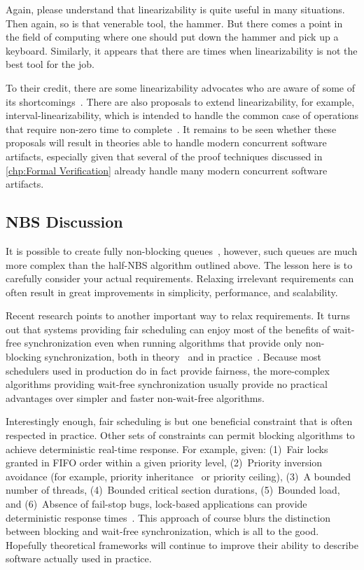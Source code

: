 Again, please understand that linearizability is quite useful in many
situations.
Then again, so is that venerable tool, the hammer.
But there comes a point in the field of computing where one should put
down the hammer and pick up a keyboard.
Similarly, it appears that there are times when linearizability is not
the best tool for the job.

To their credit, there are some linearizability advocates who are aware
of some of its shortcomings~\cite{SergioRajsbaum2020HistoryLinearizability}.
There are also proposals to extend linearizability, for example,
interval-linearizability, which is intended to handle the common case
of operations that require non-zero time to
complete~\cite{10.1145/3266457}.
It remains to be seen whether these proposals will result in theories
able to handle modern concurrent software artifacts, especially given
that several of the proof techniques discussed in \cref{chp:Formal
Verification} already handle many modern concurrent software artifacts.

\subsection{NBS Discussion}
\label{sec:advsync:NBS Discussion}

It is possible to create fully non-blocking queues~\cite{MichaelScott96},
however, such queues are much more complex than the half-NBS algorithm
outlined above.
The lesson here is to carefully consider your actual requirements.
Relaxing irrelevant requirements can often result in great
improvements in simplicity, performance, and scalability.

Recent research points to another important way to relax requirements.
It turns out that systems providing fair scheduling can enjoy most
of the benefits of wait-free synchronization even when running
algorithms that provide only non-blocking
synchronization, both in theory~\cite{DanAlitarh2013PracticalProgress}
and in practice~\cite{SamyAlBahra2013NBS}.
Because most schedulers used in production do in fact provide fairness,
the more-complex algorithms providing wait-free synchronization usually
provide no practical advantages over simpler and faster non-wait-free
algorithms.

Interestingly enough, fair scheduling is but one beneficial
constraint that is often respected in practice.
Other sets of constraints can permit blocking algorithms to
achieve deterministic real-time response.
For example, given:
(1)~Fair locks granted in FIFO order within a given priority level,
(2)~Priority inversion avoidance (for example, priority
inheritance~\cite{Takada:1995:RSN:527074.828566,Cai-DongWang1996PrioInherLock}
or priority ceiling),
(3)~A bounded number of threads,
(4)~Bounded critical section durations,
(5)~Bounded load,
and
(6)~Absence of fail-stop bugs,
lock-based applications can provide deterministic
response times~\cite{BjoernBrandenburgPhD,DipankarSarma2004OLSscalability}.
This approach of course blurs the distinction between blocking and wait-free
synchronization, which is all to the good.
Hopefully theoretical frameworks will continue to improve their ability
to describe software actually used in practice.

